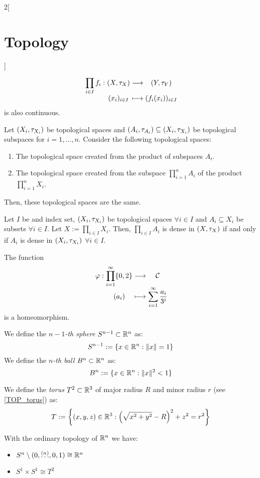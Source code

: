 \documentclass[../../../main.tex]{subfiles}
\begin{document}
\begin{multicols}{2}[\section{Topology}]
\begin{prop}
        $$
            \function{\displaystyle\prod_{i\in I}f_i}{\left(X,\topo_X\right)}{\left(Y,\topo_Y\right)}{(x_i)_{i\in I}}{(f_i(x_i))_{i\in I}}
        $$ is also continuous.
    \end{prop}
    \begin{prop}
        Let $(X_i,\tau_{X_i})$ be topological spaces and $(A_i,\tau_{A_i})\subseteq (X_i,\tau_{X_i})$ be topological subspaces for $i=1,\ldots, n$. Consider the following topological spaces:
        \begin{enumerate}
            \item The topological space created from the product of subspaces $A_i$.
            \item The topological space created from the subspace $\prod_{i=1}^nA_i$ of the product $\prod_{i=1}^nX_i$.
        \end{enumerate}
        Then, these topological spaces are the same.
    \end{prop}
    \begin{prop}
        Let $I$ be and index set, $(X_i,\tau_{X_i})$ be topological spaces $\forall i\in I$ and $A_i\subseteq X_i$ be subsets $\forall i\in I$. Let $X:=\prod_{i\in I}X_i$. Then, $\prod_{i\in I}A_i$ is dense in $(X,\tau_X)$ if and only if $A_i$ is dense in $(X_i,\tau_{X_i})$ $\forall i\in I$.
    \end{prop}
    \begin{theorem}
        The function
        $$
            \function{\varphi}{\displaystyle\prod_{i=1}^\infty\{0,2\}}{\mathcal{C}}{(a_i)}{\displaystyle\sum_{i=1}^\infty\frac{a_i}{3^i}}
        $$
        is a homeomorphism.
    \end{theorem}
    \begin{definition}
        We define the \emph{$n-1$-th sphere} $S^{n-1}\subset \mathbb{R}^n$ as: $$S^{n-1}:=\{x\in\mathbb{R}^n:\|x\|=1\}$$
        We define the \emph{$n$-th ball} $B^n\subset \mathbb{R}^n$ as: $$B^n:=\{x\in\mathbb{R}^n:\|x\|^2<1\}$$
    \end{definition}
    \begin{definition}[Torus]
        We define the \emph{torus} $T^2\subset \mathbb{R}^3$ of major radius $R$ and minor radius $r$ (see \cref{TOP_torus}) as: $$T:=\left\{(x,y,z)\in\mathbb{R}^3:{\left(\sqrt{x^2+y^2}-R\right)}^2+z^2=r^2\right\}$$
    \end{definition}
    \begin{center}
        \begin{minipage}{\linewidth}
            \centering
            
            \label{TOP_torus}
        \end{minipage}
    \end{center}
    \begin{prop}
        With the ordinary topology of $\mathbb{R}^n$ we have:
        \begin{itemize}
            \item $S^n\setminus(0,\overset{(n)}{\ldots},0,1)\cong\mathbb{R}^n$
            \item $S^1\times S^1\cong T^2$
        \end{itemize}
    \end{prop}

\end{multicols}
\end{document}
